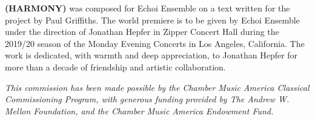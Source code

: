 \textbf{(HARMONY)} was composed for Echoi Ensemble on a text written for the
project by Paul Griffiths. The world premiere is to be given by Echoi Ensemble
under the direction of Jonathan Hepfer in Zipper Concert Hall during the
2019/20 season of the Monday Evening Concerts in Los Angeles, California. The
work is dedicated, with warmth and deep appreciation, to Jonathan Hepfer for
more than a decade of friendship and artistic collaboration.

\textit{This commission has been made possible by the Chamber Music America
Classical Commissioning Program, with generous funding provided by The Andrew
W. Mellon Foundation, and the Chamber Music America Endowment Fund.}
